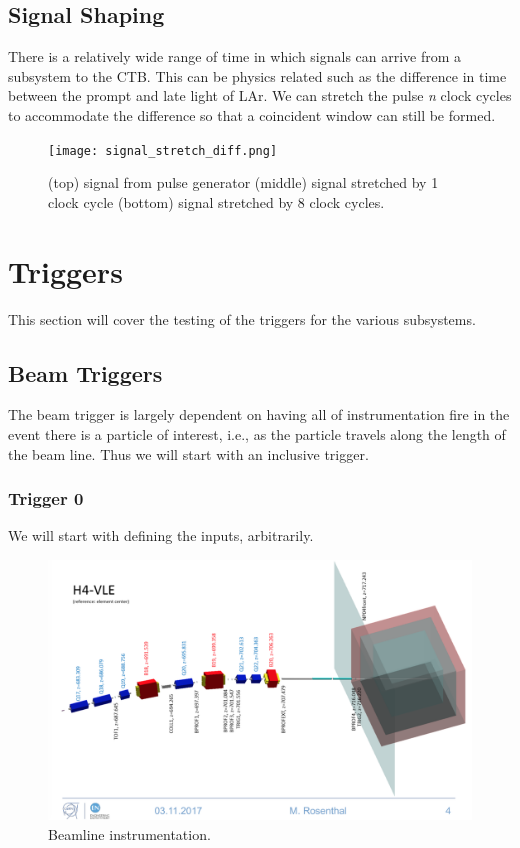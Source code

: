 \documentclass[]{report}
\begin{document}
\subsection{Signal Shaping}

There is a relatively wide range of time in which signals can arrive from a subsystem to the CTB. This can be physics related such as the difference in time between the prompt and late light of LAr. We can stretch the pulse \textit{n} clock cycles to accommodate the difference so that a coincident window can still be formed.

	 \begin{figure}[H]
	 	\centering
	 	\texttt{[image: signal\_stretch\_diff.png]}
	 	\caption{(top) signal from pulse generator (middle) signal stretched by 1 clock cycle (bottom) signal stretched by 8 clock cycles.}
	 	\label{fig:pulse_shape}
	 \end{figure}
	 	 
	 	 
\section{Triggers}

This section will cover the testing of the triggers for the various subsystems.

\subsection{Beam Triggers}

The beam trigger is largely dependent on having all of instrumentation fire in the event there is a particle of interest, i.e., as the particle travels along the length of the beam line. Thus we will start with an inclusive trigger.

\subsubsection{Trigger 0}

We will start with defining the inputs, arbitrarily.

	 \begin{figure}[H]
	 	\centering
	 	\includegraphics[width=5.25in]{h4beam.png}
	 	\caption{Beamline instrumentation.}
	 	\label{fig:h4beam}
	 \end{figure}
\end{document}
